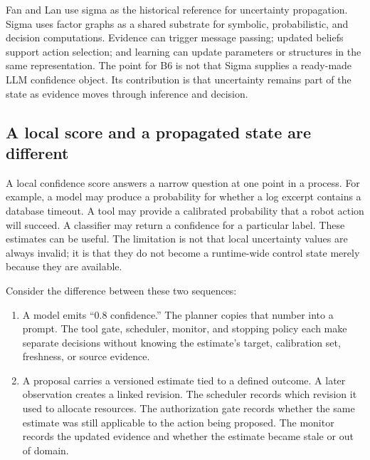 Fan and Lan use \gls{sigma} as the historical reference for uncertainty propagation. Sigma uses factor graphs as a shared substrate for symbolic, probabilistic, and decision computations. Evidence can trigger message passing; updated beliefs support action selection; and learning can update parameters or structures in the same representation. The point for B6 is not that Sigma supplies a ready-made LLM confidence object. Its contribution is that uncertainty remains part of the state as evidence moves through inference and decision.\autocite{rosenbloom2016sigma}


\subsection{A local score and a propagated state are different}
\label{sec:ch16-local-vs-propagated}

A local confidence score answers a narrow question at one point in a process. For example, a model may produce a probability for whether a log excerpt contains a database timeout. A tool may provide a calibrated probability that a robot action will succeed. A classifier may return a confidence for a particular label. These estimates can be useful. The limitation is not that local uncertainty values are always invalid; it is that they do not become a runtime-wide control state merely because they are available.

Consider the difference between these two sequences:

\begin{enumerate}
  \item A model emits ``0.8 confidence.'' The planner copies that number into a prompt. The tool gate, scheduler, monitor, and stopping policy each make separate decisions without knowing the estimate's target, calibration set, freshness, or source evidence.
  \item A proposal carries a versioned estimate tied to a defined outcome. A later observation creates a linked revision. The scheduler records which revision it used to allocate resources. The authorization gate records whether the same estimate was still applicable to the action being proposed. The monitor records the updated evidence and whether the estimate became stale or out of domain.
\end{enumerate}

